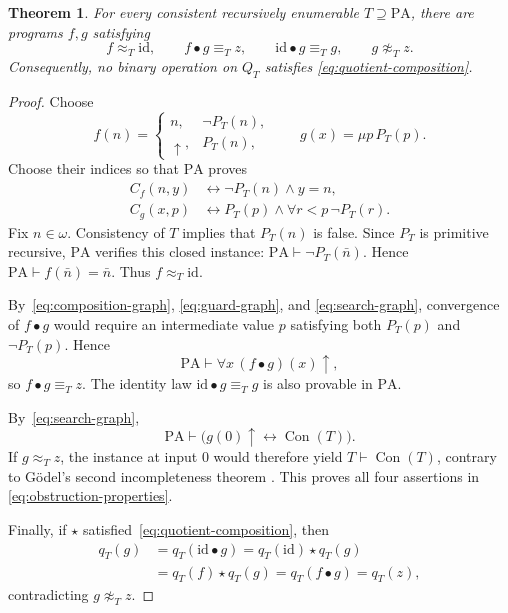 \documentclass[11pt]{article}
\newtheorem{theorem}{Theorem}
\newcommand{\PA}{\mathrm{PA}}
\newcommand{\Con}{\operatorname{Con}}
\begin{document}
\begin{theorem}\label{thm:obstruction}
For every consistent recursively enumerable $T\supseteq\PA$, there are
programs $f,g$ satisfying
\begin{equation}\label{eq:obstruction-properties}
 f\approx_T\mathrm{id},\qquad
 f\bullet g\equiv_T z,\qquad
 \mathrm{id}\bullet g\equiv_T g,\qquad
 g\not\approx_T z.
\end{equation}
Consequently, no binary operation on $Q_T$ satisfies
\eqref{eq:quotient-composition}.
\end{theorem}

\begin{proof}
Choose
\[
 f(n)=
 \begin{cases}
 n,&\neg P_T(n),\\
 \uparrow,&P_T(n),
 \end{cases}
 \qquad
 g(x)=\mu p\,P_T(p).
\]
Choose their indices so that $\PA$ proves
\begin{align}
 C_f(n,y)&\longleftrightarrow \neg P_T(n)\land y=n,
 \label{eq:guard-graph}\\
 C_g(x,p)&\longleftrightarrow
       P_T(p)\land\forall r<p\,\neg P_T(r).
 \label{eq:search-graph}
\end{align}
Fix $n\in\omega$. Consistency of $T$ implies that $P_T(n)$ is false.
Since $P_T$ is primitive recursive, $\PA$ verifies this closed instance:
$\PA\vdash\neg P_T(\bar n)$. Hence
$\PA\vdash f(\bar n)=\bar n$.
Thus $f\approx_T\mathrm{id}$.

By~\eqref{eq:composition-graph}, \eqref{eq:guard-graph}, and
\eqref{eq:search-graph}, convergence of
$f\bullet g$ would require an intermediate value $p$ satisfying both
$P_T(p)$ and $\neg P_T(p)$. Hence
\begin{equation}\label{eq:composite-empty}
 \PA\vdash\forall x\,(f\bullet g)(x)\uparrow,
\end{equation}
so $f\bullet g\equiv_Tz$. The identity law
$\mathrm{id}\bullet g\equiv_Tg$ is also provable in $\PA$.

By~\eqref{eq:search-graph},
\[
 \PA\vdash
 \bigl(g(0)\uparrow\longleftrightarrow\Con(T)\bigr).
\]
If $g\approx_Tz$, the instance at input $0$ would therefore
yield $T\vdash\Con(T)$, contrary to G\"odel's second incompleteness
theorem \cite[Theorem~2.7(ii), p.~271]{Feferman}.
This proves all four assertions in \eqref{eq:obstruction-properties}.

Finally, if $\star$ satisfied~\eqref{eq:quotient-composition}, then
\[
 \begin{aligned}
 q_T(g)
 &=q_T(\mathrm{id}\bullet g)
   =q_T(\mathrm{id})\star q_T(g)\\
 &=q_T(f)\star q_T(g)
   =q_T(f\bullet g)
   =q_T(z),
 \end{aligned}
\]
contradicting $g\not\approx_Tz$.
\end{proof}
\end{document}
